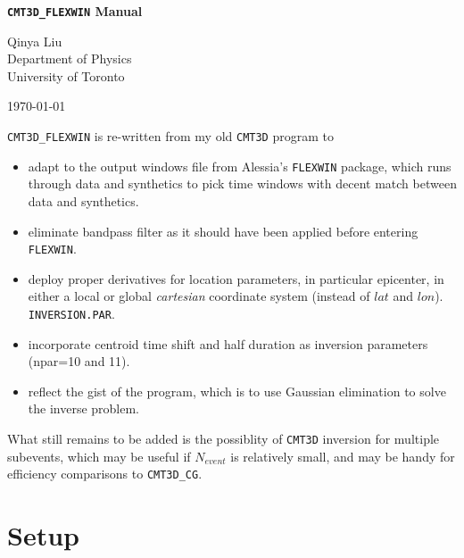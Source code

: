 \documentclass[12pt,titlepage,fleqn]{article}
\begin{document}
\begin{spacing}{1.0} %
\begin{center}

\Large {\vspace{0.1in} \bf \verb+CMT3D_FLEXWIN+ Manual}

\small
Qinya Liu \\
Department of Physics \\
University of Toronto

\today

\end{center}

\end{spacing}

\verb=CMT3D_FLEXWIN= is re-written from my old \verb=CMT3D= program to
\begin{itemize}
\item adapt to the output windows file from Alessia's \verb=FLEXWIN= package, which runs through data and synthetics to pick time windows with decent match between data and synthetics.
\item eliminate bandpass filter as it should have been applied before entering \verb+FLEXWIN+.
\item deploy proper derivatives for location parameters, in particular epicenter, in either a local or global \textit{cartesian} coordinate system (instead of $lat$ and $lon$).  \verb+INVERSION.PAR+.
\item incorporate centroid time shift and half duration as inversion parameters (npar=10 and 11).
\item reflect the gist of the program, which is to use Gaussian elimination to solve the inverse problem.
\end{itemize}
What still remains to be added is the possiblity of \verb+CMT3D+ inversion for multiple subevents, which may be useful if $N_{event}$ is relatively small, and may be handy for efficiency comparisons to \verb+CMT3D_CG+.


\section{Setup}
\end{document}
